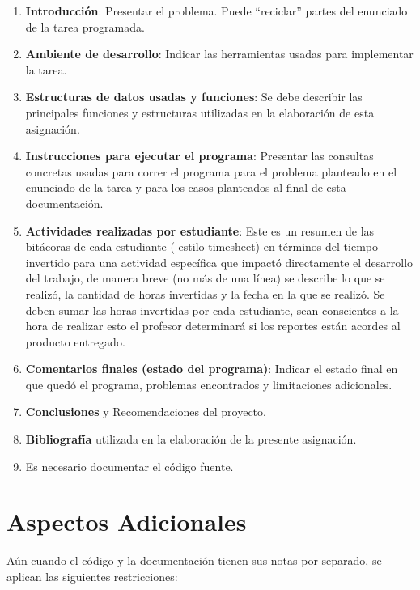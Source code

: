 \documentclass{article}
\providecommand{\tightlist}{%
          \setlength{\itemsep}{0pt}\setlength{\parskip}{0pt}}
\begin{document}
\begin{enumerate}
\def\labelenumi{\arabic{enumi}.}
\tightlist
\item
  \textbf{Introducción}: Presentar el problema. Puede ``reciclar''
  partes del enunciado de la tarea programada.
\item
  \textbf{Ambiente de desarrollo}: Indicar las herramientas usadas para
  implementar la tarea.
\item
  \textbf{Estructuras de datos usadas y funciones}: Se debe describir
  las principales funciones y estructuras utilizadas en la elaboración
  de esta asignación.
\item
  \textbf{Instrucciones para ejecutar el programa}: Presentar las
  consultas concretas usadas para correr el programa para el problema
  planteado en el enunciado de la tarea y para los casos planteados al
  final de esta documentación.
\item
  \textbf{Actividades realizadas por estudiante}: Este es un resumen de
  las bitácoras de cada estudiante ( estilo timesheet) en términos del
  tiempo invertido para una actividad específica que impactó
  directamente el desarrollo del trabajo, de manera breve (no más de una
  línea) se describe lo que se realizó, la cantidad de horas invertidas
  y la fecha en la que se realizó. Se deben sumar las horas invertidas
  por cada estudiante, sean conscientes a la hora de realizar esto el
  profesor determinará si los reportes están acordes al producto
  entregado.
\item
  \textbf{Comentarios finales (estado del programa)}: Indicar el estado
  final en que quedó el programa, problemas encontrados y limitaciones
  adicionales.
\item
  \textbf{Conclusiones} y Recomendaciones del proyecto.
\item
  \textbf{Bibliografía} utilizada en la elaboración de la presente
  asignación.
\item
  Es necesario documentar el código fuente.
\end{enumerate}

\section{Aspectos Adicionales}\label{aspectos-adicionales}

Aún cuando el código y la documentación tienen sus notas por separado,
se aplican las siguientes restricciones:
\end{document}

